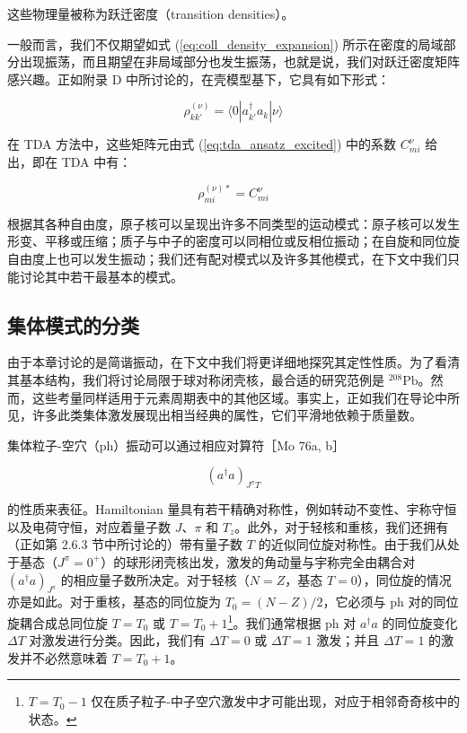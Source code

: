 这些物理量被称为跃迁密度（transition densities）。

一般而言，我们不仅期望如式 (\ref{eq:coll_density_expansion}) 所示在密度的局域部分出现振荡，而且期望在非局域部分也发生振荡，也就是说，我们对跃迁密度矩阵感兴趣。正如附录
D 中所讨论的，在壳模型基下，它具有如下形式：

\begin{equation}
\rho^{(\nu)}_{kk'}=\langle0|a^{\dagger}_{k'}a_{k}|\nu\rangle\label{eq:coll_transition_density_matrix}
\end{equation}

在 TDA 方法中，这些矩阵元由式 (\ref{eq:tda_ansatz_excited}) 中的系数 $C^{\nu}_{mi}$
给出，即在 TDA 中有：

\begin{equation}
\rho^{(\nu)*}_{mi}=C^{\nu}_{mi}\label{eq:coll_tda_density_matrix}
\end{equation}

根据其各种自由度，原子核可以呈现出许多不同类型的运动模式：原子核可以发生形变、平移或压缩；质子与中子的密度可以同相位或反相位振动；在自旋和同位旋自由度上也可以发生振动；我们还有配对模式以及许多其他模式，在下文中我们只能讨论其中若干最基本的模式。

\subsection{集体模式的分类\label{subsec:8.3.2_=0096C6=004F53=006A21=005F0F=007684=005206=007C7B}}

由于本章讨论的是简谐振动，在下文中我们将更详细地探究其定性性质。为了看清其基本结构，我们将讨论局限于球对称闭壳核，最合适的研究范例是
$^{208}\mathrm{Pb}$。然而，这些考量同样适用于元素周期表中的其他区域。事实上，正如我们在导论中所见，许多此类集体激发展现出相当经典的属性，它们平滑地依赖于质量数。

集体粒子-空穴（ph）振动可以通过相应对算符［Mo 76a, b］

\begin{equation}
(a^{\dagger}a)_{J^{\pi}T}\label{eq:coll_pair_operator}
\end{equation}

的性质来表征。Hamiltonian 量具有若干精确对称性，例如转动不变性、宇称守恒以及电荷守恒，对应着量子数 $J$、$\pi$
和 $T_{z}$。此外，对于轻核和重核，我们还拥有（正如第 2.6.3 节中所讨论的）带有量子数 $T$ 的近似同位旋对称性。由于我们从处于基态（$J^{\pi}=0^{+}$）的球形闭壳核出发，激发的角动量与宇称完全由耦合对
$(a^{\dagger}a)_{J^{\pi}}$ 的相应量子数所决定。对于轻核（$N=Z$，基态 $T=0$），同位旋的情况亦是如此。对于重核，基态的同位旋为
$T_{0}=(N-Z)/2$，它必须与 ph 对的同位旋耦合成总同位旋 $T=T_{0}$ 或 $T=T_{0}+1$\footnote{$T=T_{0}-1$ 仅在质子粒子-中子空穴激发中才可能出现，对应于相邻奇奇核中的状态。}。我们通常根据
ph 对 $a^{\dagger}a$ 的同位旋变化 $\Delta T$ 对激发进行分类。因此，我们有 $\Delta T=0$
或 $\Delta T=1$ 激发；并且 $\Delta T=1$ 的激发并不必然意味着 $T=T_{0}+1$。

